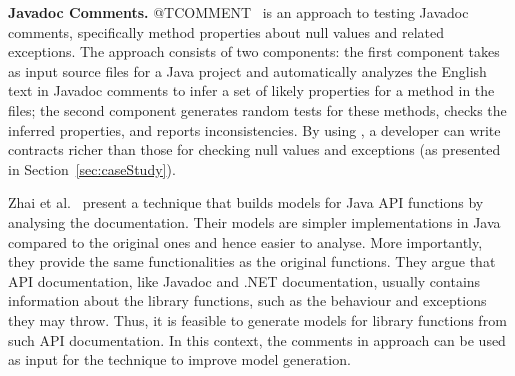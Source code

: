 \textbf{Javadoc Comments.}
@TCOMMENT~\cite{atComment} is an approach to testing Javadoc comments, specifically method properties about null values and related exceptions. The approach consists of two components: the first component takes as input source files for a Java project and automatically analyzes the English text in Javadoc comments to
infer a set of likely properties for a method in the files; the second component generates random tests for these methods, checks the inferred properties, and reports inconsistencies. By using
\contractjdoc{}, a developer can write contracts richer than those for checking null values and exceptions (as presented in Section~\ref{sec:caseStudy}).

Zhai et al.~\cite{docAnalysis} present a technique that builds models for Java API functions by analysing the documentation. Their models are simpler implementations in Java compared to the original ones and hence easier to analyse. More importantly, they provide the same functionalities as the original functions. They argue that API documentation, like Javadoc and .NET documentation, usually contains information about the library functions, such as the behaviour and exceptions they may throw. Thus, it is feasible to generate models for library functions from such API documentation. In this context, the comments in \contractjdoc{} approach can be used as input for the technique to improve model generation.


